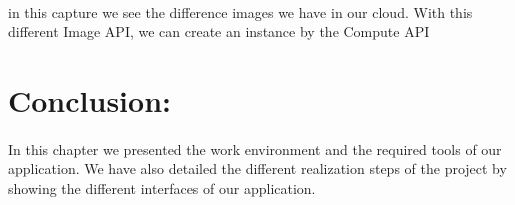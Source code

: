 \paragraph{}in this  capture we see the difference images we have in our cloud. With this different Image API, we can create an instance by the Compute API
\section{Conclusion: }
\paragraph{}In this chapter we presented the work environment and the required tools of our application.
We have also detailed the different realization steps of the project by showing the different
interfaces of our application.\par
